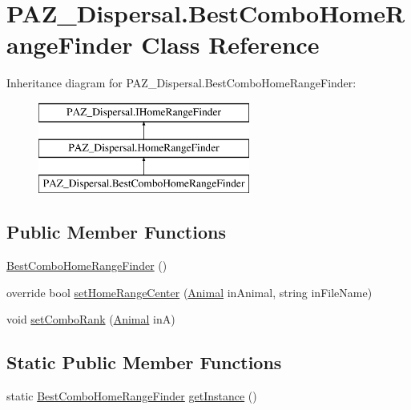 \hypertarget{class_p_a_z___dispersal_1_1_best_combo_home_range_finder}{\section{P\-A\-Z\-\_\-\-Dispersal.\-Best\-Combo\-Home\-Range\-Finder Class Reference}
\label{class_p_a_z___dispersal_1_1_best_combo_home_range_finder}
}


 


Inheritance diagram for P\-A\-Z\-\_\-\-Dispersal.\-Best\-Combo\-Home\-Range\-Finder\-:\begin{figure}[H]
\begin{center}
\leavevmode
\includegraphics[height=3.000000cm]{class_p_a_z___dispersal_1_1_best_combo_home_range_finder}
\end{center}
\end{figure}
\subsection*{Public Member Functions}
\begin{DoxyCompactItemize}
\item 
\hyperlink{class_p_a_z___dispersal_1_1_best_combo_home_range_finder_a5e4d1cdf7872a3c2014e5bd7c4eed96e}{Best\-Combo\-Home\-Range\-Finder} ()
\item 
override bool \hyperlink{class_p_a_z___dispersal_1_1_best_combo_home_range_finder_a5a7c294dab8619b923fd6dc3572be646}{set\-Home\-Range\-Center} (\hyperlink{class_p_a_z___dispersal_1_1_animal}{Animal} in\-Animal, string in\-File\-Name)
\item 
void \hyperlink{class_p_a_z___dispersal_1_1_best_combo_home_range_finder_ab3fb9665eca7f7ce350ecdc2c7e0a2c7}{set\-Combo\-Rank} (\hyperlink{class_p_a_z___dispersal_1_1_animal}{Animal} in\-A)
\end{DoxyCompactItemize}
\subsection*{Static Public Member Functions}
\begin{DoxyCompactItemize}
\item 
static \hyperlink{class_p_a_z___dispersal_1_1_best_combo_home_range_finder}{Best\-Combo\-Home\-Range\-Finder} \hyperlink{class_p_a_z___dispersal_1_1_best_combo_home_range_finder_ad69d098f31321d8b204a6e7439cb87af}{get\-Instance} ()
\end{DoxyCompactItemize}
